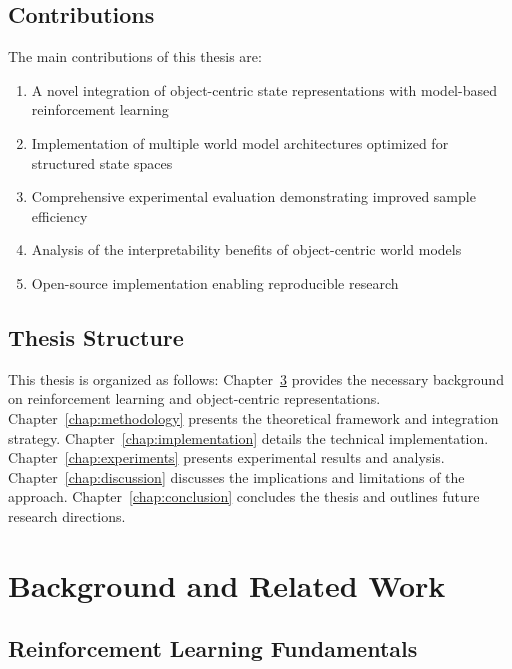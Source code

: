 \documentclass[
	english,
	ruledheaders=section,
	class=report,
	thesis={type=master},
	accentcolor=9c,
	custommargins=true,
	marginpar=false,
	parskip=half-,
	fontsize=11pt,
]{tudapub}
\begin{document}
\section{Contributions}
\label{sec:contributions}

The main contributions of this thesis are:
\begin{enumerate}
    \item A novel integration of object-centric state representations with model-based reinforcement learning
    \item Implementation of multiple world model architectures optimized for structured state spaces
    \item Comprehensive experimental evaluation demonstrating improved sample efficiency
    \item Analysis of the interpretability benefits of object-centric world models
    \item Open-source implementation enabling reproducible research
\end{enumerate}

\section{Thesis Structure}
\label{sec:structure}

This thesis is organized as follows: Chapter~\ref{chap:background} provides the necessary background on reinforcement learning and object-centric representations. Chapter~\ref{chap:methodology} presents the theoretical framework and integration strategy. Chapter~\ref{chap:implementation} details the technical implementation. Chapter~\ref{chap:experiments} presents experimental results and analysis. Chapter~\ref{chap:discussion} discusses the implications and limitations of the approach. Chapter~\ref{chap:conclusion} concludes the thesis and outlines future research directions.

\chapter{Background and Related Work}
\label{chap:background}

\section{Reinforcement Learning Fundamentals}
\label{sec:rl_fundamentals}
\end{document}

